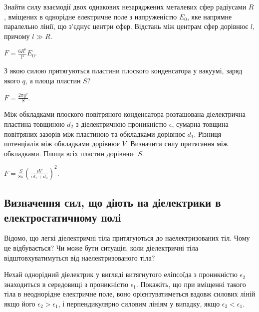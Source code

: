 \begin{problem}%
Знайти силу взаємодії двох однакових незаряджених металевих сфер радіусами $R$, вміщених в однорідне електричне поле з напруженістю $E_0$, яке напрямне паралельно лінії, що з'єднує центри сфер. Відстань між центрам сфер дорівнює $l$, причому $l \gg R$.
\begin{solution}
	$F = \frac{6R^6}{l^4} E_0$.
\end{solution}
\end{problem}

\begin{problem}
З якою силою притягуються пластини плоского конденсатора у вакуумі, заряд якого $q$, а площа пластин $S$?
\begin{solution}
	$F = \frac{2\pi q^2}{S}$.
\end{solution}
\end{problem}

\begin{problem}
Між обкладками плоского повітряного конденсатора розташована діелектрична пластина товщиною $d_2$ з діелектричною проникністю $\epsilon$, сумарна товщина повітряних зазорів між пластиною та обкладками дорівнює $d_1$. Різниця потенціалів між обкладками дорівнює $V$. Визначити силу притягання між обкладками. Площа всіх пластин дорівнює~$S$.
\begin{solution}
	$ F = \frac{S}{8\pi} \left( \frac{\epsilon V}{ \epsilon d_1 + d_2} \right)^2 $.
\end{solution}
\end{problem}

\subsection*{Визначення сил, що діють на діелектрики в електростатичному полі}

\begin{problem}
    Відомо, що легкі діелектричні тіла притягуються до наелектризованих тіл. Чому це відбувається? Чи може бути ситуація, коли діелектричні тіла відштовхуватимуться від наелектризованого тіла?
\end{problem}

\begin{problem}
	Нехай однорідний діелектрик у вигляді витягнутого еліпсоїда з проникністю $\epsilon_2$ знаходиться в середовищі з проникністю $\epsilon_1$. Покажіть, що при вміщенні такого тіла в неоднорідне електричне поле, воно орієнтуватиметься вздовж силових ліній якщо його $\epsilon_2 > \epsilon_1$, і перпендикулярно силовим лініям у випадку, якщо $\epsilon_2 < \epsilon_1$.
\end{problem}

